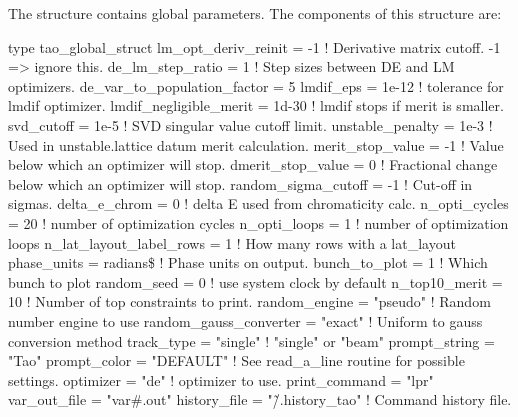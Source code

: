 {{{{{{{{
The  structure contains \tao global parameters. The components of this structure are:
\begin{example}
type tao_global_struct
  lm_opt_deriv_reinit = -1         ! Derivative matrix cutoff. -1 => ignore this.
  de_lm_step_ratio = 1             ! Step sizes between DE and LM optimizers.
  de_var_to_population_factor = 5 
  lmdif_eps = 1e-12                ! tolerance for lmdif optimizer.
  lmdif_negligible_merit = 1d-30   ! lmdif stops if merit is smaller.
  svd_cutoff = 1e-5                ! SVD singular value cutoff limit.
  unstable_penalty = 1e-3          ! Used in unstable.lattice datum merit calculation.
  merit_stop_value = -1            ! Value below which an optimizer will stop.
  dmerit_stop_value = 0            ! Fractional change below which an optimizer will stop.
  random_sigma_cutoff = -1         ! Cut-off in sigmas.
  delta_e_chrom = 0                ! delta E used from chromaticity calc.
  n_opti_cycles = 20               ! number of optimization cycles
  n_opti_loops = 1                 ! number of optimization loops
  n_lat_layout_label_rows = 1      ! How many rows with a lat_layout
  phase_units = radians\$           ! Phase units on output.
  bunch_to_plot = 1                ! Which bunch to plot
  random_seed = 0                  ! use system clock by default
  n_top10_merit = 10               ! Number of top constraints to print.
  random_engine = "pseudo"         ! Random number engine to use
  random_gauss_converter = "exact" ! Uniform to gauss conversion method
  track_type = "single"            ! "single" or "beam" 
  prompt_string = "Tao"
  prompt_color = "DEFAULT"         ! See read_a_line routine for possible settings.
  optimizer     = "de"             ! optimizer to use.
  print_command = "lpr"
  var_out_file  = "var#.out"
  history_file = "\~/.history_tao"  ! Command history file.

\end{example}}}}}}}}}
